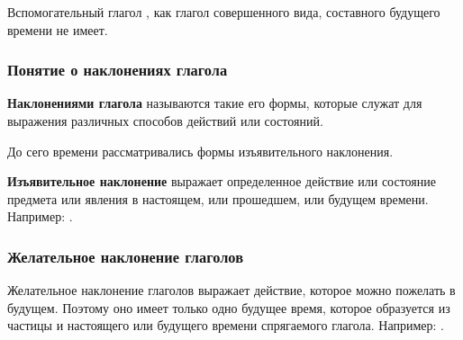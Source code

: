 \documentclass[11pt,a4paper,oneside]{memoir}
\begin{document}
    Вспомогательный глагол {}, как глагол совершенного вида, составного будущего времени не имеет.

                \subsubsection{Понятие о наклонениях глагола}

    \textbf{Наклонениями глагола} называются такие его формы, которые служат для выражения различных способов действий или состояний.
    
    До сего времени рассматривались формы изъявительного наклонения.
    
    \textbf{Изъявительное наклонение} выражает определенное действие или состояние предмета или явления в настоящем, или прошедшем, или будущем времени. Например: {}.

                \subsubsection{Желательное наклонение глаголов}

    Желательное наклонение глаголов выражает действие, которое можно пожелать в будущем. Поэтому оно имеет только одно будущее время, которое образуется из частицы {} и настоящего или будущего времени спрягаемого глагола. Например: {}.
    
\end{document}
